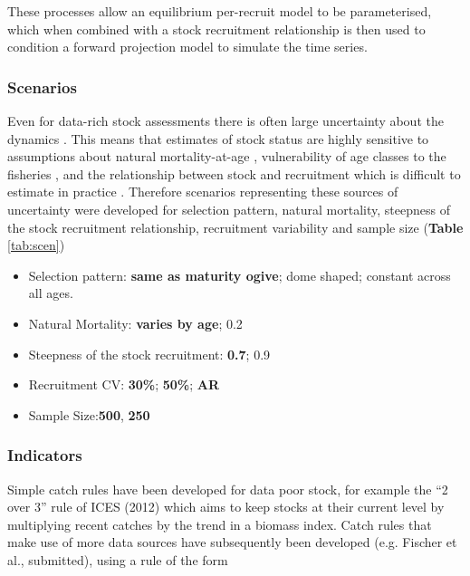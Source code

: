 \documentclass[12pt,doublespacing,a4paper]{ouparticle}
\begin{document}
These processes allow an equilibrium per-recruit model to be parameterised, which when combined with a stock recruitment relationship \cite{sissenwine1987alternative} is then used to condition a forward projection model to simulate the time series.

\subsubsection{Scenarios}

Even for data-rich stock assessments there is often large uncertainty about the dynamics \citep[i.e. model uncertainty;][]{punt2008refocusing}. This means that estimates of stock status are highly sensitive to assumptions about natural mortality-at-age \citep{jiao2012modelling}, vulnerability of age classes to the fisheries \citep{brooks2009analytical}, and the relationship between stock and recruitment which is difficult to estimate in practice \citep[e.g.][]{vert2013frequency,szuwalski2014examining,cury2014resolving,kell2015spawning,pepin2015reconsidering}. Therefore scenarios \citep[][]{ono2015importance,kell2015spawning,boorman1997recognising} representing these sources of uncertainty were developed for selection pattern, natural mortality, steepness of the stock recruitment relationship, recruitment variability and sample size (\textbf{Table} \ref{tab:scen})

\begin{itemize}
 \item Selection pattern: \textbf{same as maturity ogive}; dome shaped; constant across all ages.
 \item Natural Mortality: \textbf{varies by age}; 0.2 
 \item Steepness of the stock recruitment: \textbf{0.7}; 0.9 
 \item Recruitment CV: \textbf{30\%}; \textbf{50\%}; \textbf{AR}
 \item Sample Size:\textbf{500}, \textbf{250}
\end{itemize}


\subsubsection{Indicators}




Simple catch rules have been developed for data poor stock, for example the “2 over 3” rule  of ICES (2012) which aims to keep stocks at their current level by multiplying recent catches by the trend in a biomass index. Catch rules that make use of more data sources have subsequently been developed (e.g. Fischer et al., submitted), using a rule of the form
\end{document}
